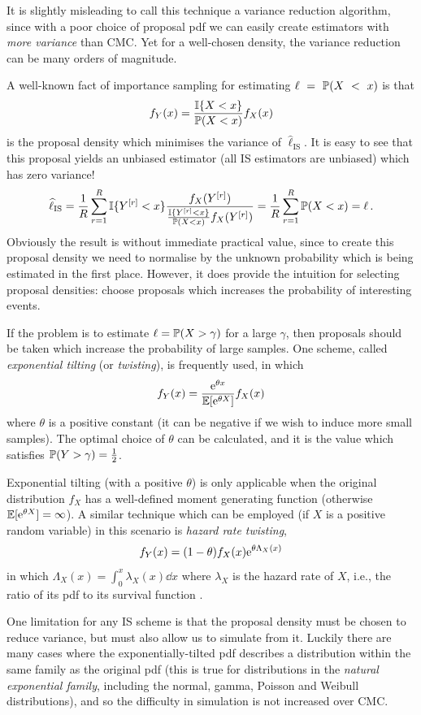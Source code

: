It is slightly misleading to call this technique a variance reduction algorithm, since with a poor choice of proposal pdf we can easily create estimators with \emph{more variance} than CMC. Yet for a well-chosen density, the variance reduction can be many orders of magnitude.

A well-known fact of importance sampling for estimating $\ell~=~\operatorname{{\mathbb P}}(X~<~x)$ is that
\[ f_Y(x) = \frac{\mathbb{I}\{  X < x  \}}{\operatorname{{\mathbb P}}(X < x)} f_X(x) \]
is the proposal density which minimises the variance of $\hat{\ell}_{\mathrm{IS}}$. It is easy to see that this proposal yields an unbiased estimator (all IS estimators are unbiased) which has zero variance!
\[ \widehat{\ell}_{\mathrm{IS}} = \frac1R \sum_{r=1}^R \mathbb{I}\{  Y^{[r]} < x  \} \frac{f_X(Y^{[r]})}{ \frac{\mathbb{I}\{  Y^{[r]} < x  \}}{\operatorname{{\mathbb P}}(X<x)} f_X(Y^{[r]})} = \frac1R \sum_{r=1}^R \operatorname{{\mathbb P}}(X<x) = \ell \,. \]
Obviously the result is without immediate practical value, since to create this proposal density we need to normalise by the unknown probability which is being estimated in the first place. However, it does provide the intuition for selecting proposal densities: choose proposals which increases the probability of interesting events.

If the problem is to estimate $\ell = \operatorname{{\mathbb P}}(X > \gamma)$ for a large $\gamma$, then proposals should be taken which increase the probability of large samples. One scheme, called \emph{exponential tilting} (or \emph{twisting}), is frequently used, in which
\begin{equation} \label{def-exp-tilting}
f_Y(x) = \frac{\mathrm{e}^{\theta x}}{\operatorname{{\mathbb E}}[\mathrm{e}^{\theta X}]} f_X(x)
\end{equation}
where $\theta$ is a positive constant (it can be negative if we wish to induce more small samples). The optimal choice of $\theta$ can be calculated, and it is the value which satisfies $\operatorname{{\mathbb P}}(Y > \gamma) = \frac12$.

Exponential tilting (with a positive $\theta$) is only applicable when the original distribution $f_X$ has a well-defined moment generating function (otherwise $\operatorname{{\mathbb E}}[\mathrm{e}^{\theta X}] = \infty$). A similar technique which can be employed (if $X$ is a positive random variable) in this scenario is \emph{hazard rate twisting},
\[ f_Y(x) = (1-\theta) f_X(x) \mathrm{e}^{\theta \Lambda_X(x)} \]
in which $\Lambda_X(x) = \int_0^x \lambda_X(x) \dd x$ where $\lambda_X$ is the hazard rate of $X$, i.e., the ratio of its pdf to its survival function \cite{juneja2002simulating}.

One limitation for any IS scheme is that the proposal density must be chosen to reduce variance, but must also allow us to simulate from it. Luckily there are many cases where the exponentially-tilted pdf describes a distribution within the same family as the original pdf (this is true for distributions in the \emph{natural exponential family}, including the normal, gamma, Poisson and Weibull distributions), and so the difficulty in simulation is not increased over CMC.

